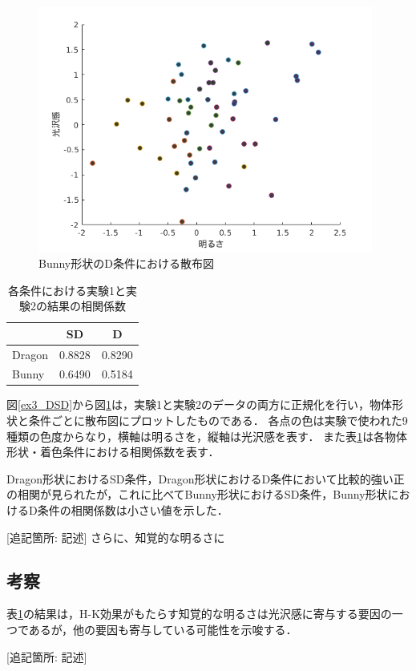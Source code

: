             \begin{figure}[h]
                \centering
                \includegraphics[width=11.0cm]{./img/ex3_BD.png}
                \caption{Bunny形状のD条件における散布図}
                \label{ex3_BD}
            \end{figure}

            \begin{table}[h]
                \centering
                \caption{各条件における実験1と実験2の結果の相関係数}
                \begin{tabular}{|l||c|c|} \hline
                                & SD       & D        \\ \hline \hline
                    Dragon      & 0.8828   & 0.8290   \\ \hline
                    Bunny       & 0.6490   & 0.5184   \\ \hline
                \end{tabular}
                \label{cc}
            \end{table}

            図\ref{ex3_DSD}から図\ref{ex3_BD}は，実験1と実験2のデータの両方に正規化を行い，物体形状と条件ごとに散布図にプロットしたものである．
            各点の色は実験で使われた9種類の色度からなり，横軸は明るさを，縦軸は光沢感を表す．
            また表\ref{cc}は各物体形状・着色条件における相関係数を表す．

            Dragon形状におけるSD条件，Dragon形状におけるD条件において比較的強い正の相関が見られたが，これに比べてBunny形状におけるSD条件，Bunny形状におけるD条件の相関係数は小さい値を示した．
            
            [追記箇所: 記述]
            さらに、知覚的な明るさに

        \subsection{考察}
        
            表\ref{cc}の結果は，H-K効果がもたらす知覚的な明るさは光沢感に寄与する要因の一つであるが，他の要因も寄与している可能性を示唆する．

            [追記箇所: 記述]

    \newpage